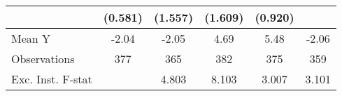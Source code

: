{\begin{tabular}{l*{5}{c}}
            &     (0.581)         &     (1.557)         &     (1.609)         &     (0.920)         &                     \\
\midrule
Mean Y      &       -2.04         &       -2.05         &        4.69         &        5.48         &       -2.06         \\
Observations&         377         &         365         &         382         &         375         &         359         \\
Exc. Inst. F-stat&                     &       4.803         &       8.103         &       3.007         &       3.101         \\
\bottomrule
\end{tabular}
}
